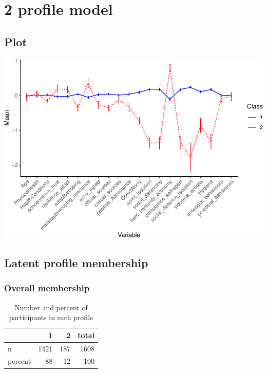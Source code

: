 \documentclass[]{article}
\begin{document}
\newpage

\hypertarget{profile-model}{%
\section{2 profile model}\label{profile-model}}

\hypertarget{plot}{%
\subsection{Plot}\label{plot}}

\includegraphics{lpa_analyses_files/figure-latex/unnamed-chunk-5-1.pdf}

\hypertarget{latent-profile-membership}{%
\subsection{Latent profile membership}\label{latent-profile-membership}}

\hypertarget{overall-membership}{%
\subsubsection{Overall membership}\label{overall-membership}}

\begin{table}[H]

\caption{\label{tab:unnamed-chunk-6}Number and percent of participants in each profile}
\centering
\fontsize{6}{8}\selectfont
\begin{tabular}[t]{lrrr}
\toprule
  & 1 & 2 & total\\
\midrule
n & 1421 & 187 & 1608\\
percent & 88 & 12 & 100\\
\bottomrule
\end{tabular}
\end{table}
\end{document}
